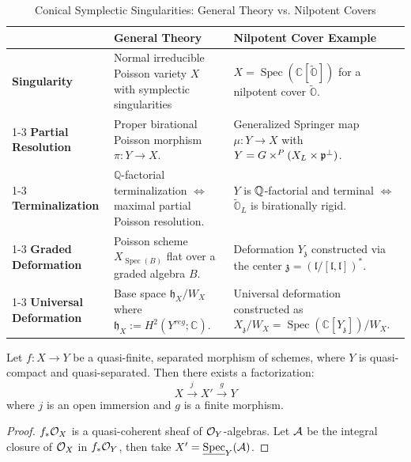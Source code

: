 \begin{table}[htbp]
  \centering
  \caption{Conical Symplectic Singularities: General Theory vs. Nilpotent Covers}
  \begin{tabularx}{\textwidth}{@{}l >{\raggedright\arraybackslash}X >{\raggedright\arraybackslash}X @{} }
    \toprule
     & \textbf{General Theory} & \textbf{Nilpotent Cover Example} \\
    \midrule
    \textbf{Singularity} & Normal irreducible Poisson variety $X$ with symplectic singularities & $X = \operatorname{Spec}(\mathbb{C}[\widetilde{\mathbb{O}}])$ for a nilpotent cover $\widetilde{\mathbb{O}}$. \\
    \cmidrule(lr){1-3}
    \textbf{Partial Resolution} & Proper birational Poisson morphism $\pi: Y \to X$. & Generalized Springer map $\mu: Y \to X$ with $Y = G \times^{P} (X_L \times \mathfrak{p}^{\perp})$. \\
    \cmidrule(lr){1-3}
    \textbf{Terminalization} & $\mathbb{Q}$-factorial terminalization $\iff$ maximal partial Poisson resolution. & $Y$ is $\mathbb{Q}$-factorial and terminal $\iff$ $\widetilde{\mathbb{O}}_L$ is birationally rigid. \\
    \cmidrule(lr){1-3}
    \textbf{Graded Deformation} & Poisson scheme $X_{\operatorname{Spec}(B)}$ flat over a graded algebra $B$. & Deformation $Y_{\mathfrak{z}}$ constructed via the center $\mathfrak{z} = (\mathfrak{l}/[\mathfrak{l}, \mathfrak{l}])^*$. \\
    \cmidrule(lr){1-3}
    \textbf{Universal Deformation} & Base space $\mathfrak{h}_X / W_X$ where $\mathfrak{h}_X := H^2(Y^{reg}; \mathbb{C})$. & Universal deformation constructed as $X_{\mathfrak{z}}/W_X = \operatorname{Spec}(\mathbb{C}[Y_{\mathfrak{z}}])/W_X$. \\
    \bottomrule
  \end{tabularx}
\end{table}

\newpage


\begin{thm}
  Let $f: X \to Y$ be a quasi-finite, separated morphism of schemes, where $Y$ is quasi-compact and quasi-separated. Then there exists a factorization:\[X \xrightarrow{\ j\ } X' \xrightarrow{\ g\ } Y\]where $j$ is an open immersion and $g$ is a finite morphism.
\end{thm}

\begin{proof}
  $f_*\mathcal{O}_X$ is a quasi-coherent sheaf of $\mathcal{O}_Y$-algebras. Let $\mathcal{A}$ be the integral closure of $\mathcal{O}_X$ in $f_*\mathcal{O}_Y$, then take $X' = \underline{\operatorname{Spec}}_Y(\mathcal{A})$.
\end{proof}

